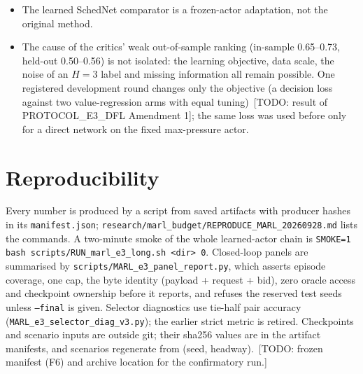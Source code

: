 \documentclass[11pt]{article}
\theoremstyle{definition}
\newif\ifshownotes\shownotestrue
\newcommand{\TODO}[1]{\ifshownotes{\color{todocol}\,\textsf{\footnotesize[TODO: #1]}}\fi}
\begin{document}
\begin{itemize}
for the learned critic.
\item The learned SchedNet comparator is a frozen-actor adaptation, not the original method.
\item The cause of the critics' weak out-of-sample ranking (in-sample 0.65--0.73, held-out 0.50--0.56) is not isolated: the
learning objective, data scale, the noise of an $H=3$ label and missing information all remain possible. One
registered development round changes only the objective (a decision loss against two value-regression arms with equal
tuning) \TODO{result of PROTOCOL\_E3\_DFL Amendment 1}; the same loss was used before only for a direct network on the
fixed max-pressure actor.
\end{itemize}

\section{Reproducibility}
Every number is produced by a script from saved artifacts with producer hashes in its \texttt{manifest.json};
\texttt{research/marl\_budget/REPRODUCE\_MARL\_20260928.md} lists the commands. A two-minute smoke of the whole
learned-actor chain is \texttt{SMOKE=1 bash scripts/RUN\_marl\_e3\_long.sh <dir> 0}. Closed-loop panels are summarised
by \texttt{scripts/MARL\_e3\_panel\_report.py}, which asserts episode coverage, one cap, the byte identity
(payload + request + bid), zero oracle access and checkpoint ownership before it reports, and refuses the reserved
test seeds unless \texttt{--final} is given. Selector diagnostics use tie-half pair accuracy
(\texttt{MARL\_e3\_selector\_diag\_v3.py}); the earlier strict metric is retired. Checkpoints and scenario inputs
are outside git; their sha256 values are in the artifact manifests, and scenarios regenerate from (seed, headway).
\TODO{frozen manifest (F6) and archive location for the confirmatory run.}
\end{document}
